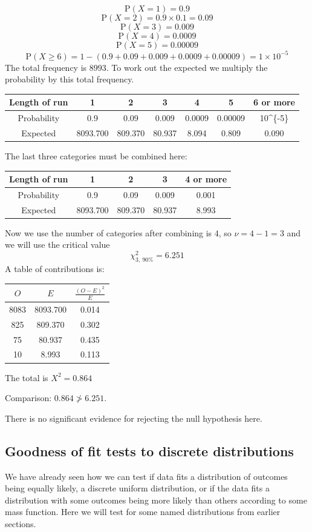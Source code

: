 \documentclass[
]{book}
\theoremstyle{definition}
\theoremstyle{definition}
\theoremstyle{definition}
\theoremstyle{definition}
\theoremstyle{remark}
\begin{document}
\[\text{P}(X=1) = 0.9\]
\[\text{P}(X=2) = 0.9\times0.1 = 0.09 \]
\[\text{P}(X=3) = 0.009\]
\[\text{P}(X=4) = 0.0009\]
\[\text{P}(X=5) = 0.00009\]
\[\text{P}(X\geq 6) = 1- (0.9+0.09+0.009+0.0009+0.00009) = 1\times10^{-5}\]
The total frequency is \(8993\). To work out the expected we multiply the probability by this total frequency.

\begin{longtable}[]{@{}ccccccc@{}}
\toprule
Length of run & 1 & 2 & 3 & 4 & 5 & 6 or more\tabularnewline
\midrule
\endhead
Probability & 0.9 & 0.09 & 0.009 & 0.0009 & 0.00009 & 10\^{}\{-5\}\tabularnewline
Expected & 8093.700 & 809.370 & 80.937 & 8.094 & 0.809 & 0.090\tabularnewline
\bottomrule
\end{longtable}

The last three categories must be combined here:

\begin{longtable}[]{@{}ccccc@{}}
\toprule
Length of run & 1 & 2 & 3 & 4 or more\tabularnewline
\midrule
\endhead
Probability & 0.9 & 0.09 & 0.009 & 0.001\tabularnewline
Expected & 8093.700 & 809.370 & 80.937 & 8.993\tabularnewline
\bottomrule
\end{longtable}

Now we use the number of categories after combining is \(4\), so \(\nu = 4-1=3\) and we will use the critical value
\[\chi^2_{3 , \ 90\%}= 6.251\]
A table of contributions is:

\begin{longtable}[]{@{}ccc@{}}
\toprule
\(O\) & \(E\) & \(\frac{(O-E)^2}{E}\)\tabularnewline
\midrule
\endhead
8083 & 8093.700 & 0.014\tabularnewline
825 & 809.370 & 0.302\tabularnewline
75 & 80.937 & 0.435\tabularnewline
10 & 8.993 & 0.113\tabularnewline
\bottomrule
\end{longtable}

The total is \(X^2 = 0.864\)

Comparison: \(0.864\ngtr 6.251\).

There is no significant evidence for rejecting the null hypothesis here.

\hypertarget{goodness-of-fit-tests-to-discrete-distributions}{%
\subsection{Goodness of fit tests to discrete distributions}\label{goodness-of-fit-tests-to-discrete-distributions}}

We have already seen how we can test if data fits a distribution of outcomes being equally likely, a discrete uniform distribution, or if the data fits a distribution with some outcomes being more likely than others according to some mass function. Here we will test for some named distributions from earlier sections.
\end{document}

